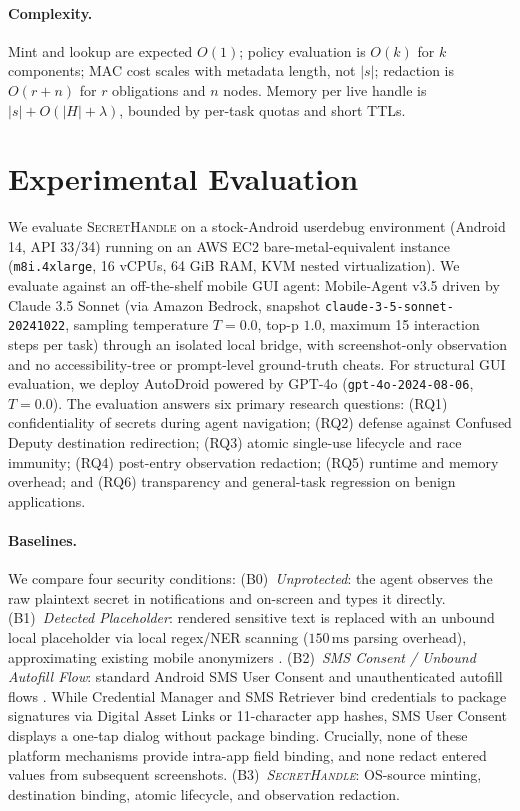 \documentclass[sigconf,10pt]{acmart}
\newcommand{\SH}{\textsc{SecretHandle}}
\theoremstyle{acmplain}%
\begin{document}
\paragraph{Complexity.} Mint and lookup are expected $O(1)$; policy evaluation is $O(k)$ for $k$ components; MAC cost scales with metadata length, not $|s|$; redaction is $O(r+n)$ for $r$ obligations and $n$ nodes. Memory per live handle is $|s|+O(|H|+\lambda)$, bounded by per-task quotas and short TTLs.
\section{Experimental Evaluation}
\label{sec:evidence}

We evaluate \SH{} on a stock-Android userdebug environment (Android 14, API 33/34) running on an AWS EC2 bare-metal-equivalent instance (\texttt{m8i.4xlarge}, 16 vCPUs, 64 GiB RAM, KVM nested virtualization). We evaluate against an off-the-shelf mobile GUI agent: Mobile-Agent v3.5 \cite{wang2024mobileagent,ye2025mobileagentv3} driven by Claude 3.5 Sonnet (via Amazon Bedrock, snapshot \texttt{claude-3-5-sonnet-20241022}, sampling temperature $T=0.0$, top-p $1.0$, maximum 15 interaction steps per task) through an isolated local bridge, with screenshot-only observation and no accessibility-tree or prompt-level ground-truth cheats. For structural GUI evaluation, we deploy AutoDroid \cite{wen2023autodroid} powered by GPT-4o (\texttt{gpt-4o-2024-08-06}, $T=0.0$). The evaluation answers six primary research questions: (RQ1) confidentiality of secrets during agent navigation; (RQ2) defense against Confused Deputy destination redirection; (RQ3) atomic single-use lifecycle and race immunity; (RQ4) post-entry observation redaction; (RQ5) runtime and memory overhead; and (RQ6) transparency and general-task regression on benign applications.

\paragraph{Baselines.} We compare four security conditions:
(B0)~\emph{Unprotected}: the agent observes the raw plaintext secret in notifications and on-screen and types it directly.
(B1)~\emph{Detected Placeholder}: rendered sensitive text is replaced with an unbound local placeholder via local regex/NER scanning ($150\,\text{ms}$ parsing overhead), approximating existing mobile anonymizers \cite{zhao2026anonymization}.
(B2)~\emph{SMS Consent / Unbound Autofill Flow}: standard Android SMS User Consent and unauthenticated autofill flows \cite{androidAutofillServices,androidCredentialManager,androidSmsConsent}. While Credential Manager and SMS Retriever bind credentials to package signatures via Digital Asset Links or 11-character app hashes, SMS User Consent displays a one-tap dialog without package binding. Crucially, none of these platform mechanisms provide intra-app field binding, and none redact entered values from subsequent screenshots.
(B3)~\emph{\SH}: OS-source minting, destination binding, atomic lifecycle, and observation redaction.
\end{document}
